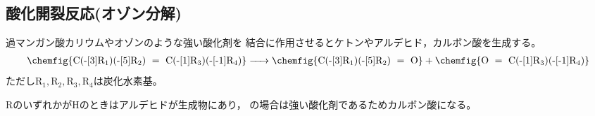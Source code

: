 \subsection{酸化開裂反応(オゾン分解)}
\begin{screen}
  過マンガン酸カリウムやオゾンのような強い酸化剤を
  結合に作用させるとケトンやアルデヒド，カルボン酸を生成する。
\begin{gather*}
  \ce{
    \chemfig{C(-[3]R_1)(-[5]R_2) = C(-[1]R_3)(-[-1]R_4)}
    -> \chemfig{C(-[3]R_1)(-[5]R_2) = O}
    +\chemfig{O = C(-[1]R_3)(-[-1]R_4)}}
\end{gather*}
ただし$\mathrm{R_1,R_2,R_3,R_4}$は炭化水素基。
\end{screen}

$\mathrm{R}$のいずれかがHのときはアルデヒドが生成物にあり，
の場合は強い酸化剤であるためカルボン酸になる。
